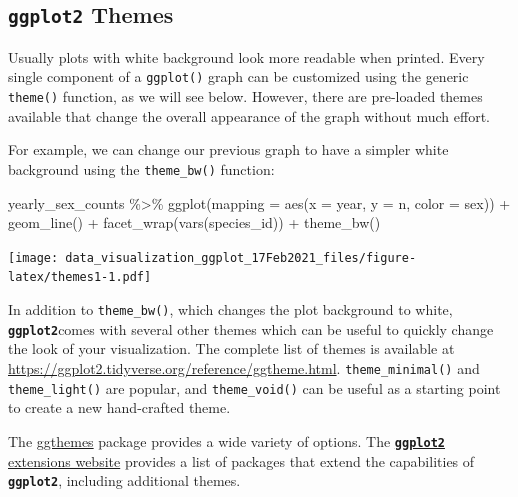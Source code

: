 \documentclass[
]{article}
\newenvironment{Shaded}{\begin{snugshade}}{\end{snugshade}}
\newcommand{\AttributeTok}[1]{\textcolor[rgb]{0.77,0.63,0.00}{#1}}
\newcommand{\FunctionTok}[1]{\textcolor[rgb]{0.00,0.00,0.00}{#1}}
\newcommand{\NormalTok}[1]{#1}
\newcommand{\SpecialCharTok}[1]{\textcolor[rgb]{0.00,0.00,0.00}{#1}}
\begin{document}
\hypertarget{ggplot2-themes}{%
\subsection{\texorpdfstring{\textbf{\texttt{ggplot2}}
Themes}{ggplot2 Themes}}\label{ggplot2-themes}}

Usually plots with white background look more readable when printed.
Every single component of a \texttt{ggplot()} graph can be customized
using the generic \texttt{theme()} function, as we will see below.
However, there are pre-loaded themes available that change the overall
appearance of the graph without much effort.

For example, we can change our previous graph to have a simpler white
background using the \texttt{theme\_bw()} function:

\begin{Shaded}
\begin{Highlighting}[]
\NormalTok{yearly\_sex\_counts }\SpecialCharTok{\%\textgreater{}\%} 
 \FunctionTok{ggplot}\NormalTok{(}\AttributeTok{mapping =} \FunctionTok{aes}\NormalTok{(}\AttributeTok{x =}\NormalTok{ year, }\AttributeTok{y =}\NormalTok{ n, }\AttributeTok{color =}\NormalTok{ sex)) }\SpecialCharTok{+}
     \FunctionTok{geom\_line}\NormalTok{() }\SpecialCharTok{+}
     \FunctionTok{facet\_wrap}\NormalTok{(}\FunctionTok{vars}\NormalTok{(species\_id)) }\SpecialCharTok{+}
     \FunctionTok{theme\_bw}\NormalTok{()}
\end{Highlighting}
\end{Shaded}

\texttt{[image: data\_visualization\_ggplot\_17Feb2021\_files/figure-latex/themes1-1.pdf]}

In addition to \texttt{theme\_bw()}, which changes the plot background
to white, \textbf{\texttt{ggplot2}}comes with several other themes which
can be useful to quickly change the look of your visualization. The
complete list of themes is available at
\url{https://ggplot2.tidyverse.org/reference/ggtheme.html}.
\texttt{theme\_minimal()} and \texttt{theme\_light()} are popular, and
\texttt{theme\_void()} can be useful as a starting point to create a new
hand-crafted theme.

The
\href{https://jrnold.github.io/ggthemes/reference/index.html}{ggthemes}
package provides a wide variety of options. The
\href{https://exts.ggplot2.tidyverse.org/}{\textbf{\texttt{ggplot2}}
extensions website} provides a list of packages that extend the
capabilities of \textbf{\texttt{ggplot2}}, including additional themes.
\end{document}
